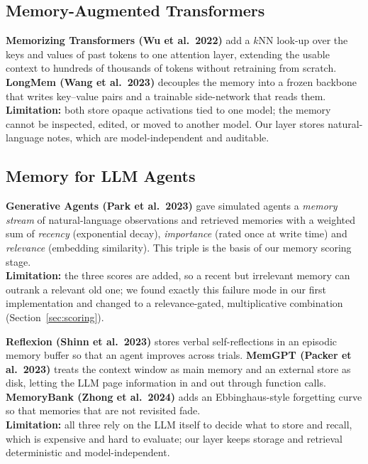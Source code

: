 \subsection{Memory-Augmented Transformers}
\textbf{Memorizing Transformers (Wu et al.\ 2022)} \cite{memtrans} add a $k$NN look-up over the keys and
values of past tokens to one attention layer, extending the usable context to hundreds of thousands of
tokens without retraining from scratch. \textbf{LongMem (Wang et al.\ 2023)} \cite{longmem} decouples the
memory into a frozen backbone that writes key--value pairs and a trainable side-network that reads them. \\
\textbf{Limitation:} both store opaque activations tied to one model; the memory cannot be inspected,
edited, or moved to another model. Our layer stores natural-language notes, which are model-independent
and auditable.

\subsection{Memory for LLM Agents}
\textbf{Generative Agents (Park et al.\ 2023)} \cite{park2023} gave simulated agents a \emph{memory stream}
of natural-language observations and retrieved memories with a weighted sum of \emph{recency}
(exponential decay), \emph{importance} (rated once at write time) and \emph{relevance} (embedding
similarity). This triple is the basis of our memory scoring stage. \\
\textbf{Limitation:} the three scores are added, so a recent but irrelevant memory can outrank a relevant
old one; we found exactly this failure mode in our first implementation and changed to a relevance-gated,
multiplicative combination (Section~\ref{sec:scoring}).

\textbf{Reflexion (Shinn et al.\ 2023)} \cite{reflexion} stores verbal self-reflections in an episodic
memory buffer so that an agent improves across trials. \textbf{MemGPT (Packer et al.\ 2023)}
\cite{packer2023} treats the context window as main memory and an external store as disk, letting the LLM
page information in and out through function calls. \textbf{MemoryBank (Zhong et al.\ 2024)}
\cite{zhong2024} adds an Ebbinghaus-style forgetting curve so that memories that are not revisited fade. \\
\textbf{Limitation:} all three rely on the LLM itself to decide what to store and recall, which is
expensive and hard to evaluate; our layer keeps storage and retrieval deterministic and model-independent.

